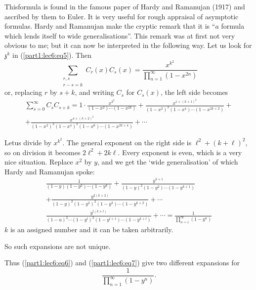 This\pageoriginale  formula is found in the famous paper of Hardy and Ramanujan
(1917) and ascribed by them to Euler. It is very useful for rough
appraisal of asymptotic formulas. Hardy and Ramanujan make the cryptic
remark that it is ``$a$ formula which lends itself to wide
generalisations''. This remark was at first not very obvious to me;
but it can now be interpreted in the following way. Let us look for
$\mathfrak{z}^k$ in (\ref{part1:lec6:eq5}). Then
$$
\sum_{\substack{r,s\\r-s=k}} C_r (x) C_s (x)
=\frac{x^{k^2}}{\prod\limits^\infty_{n=1} (1-x^{2n})}
$$ 
or, replacing $r$ by $s+k$, and writing $C_s$ for $C_s(x)$, the left
side becomes
\begin{multline*}
  \sum^\infty_{s=0} C_s C_{s+k}  = 1\cdot \frac{x^{k^2}}{(1-x^2)
    \cdots (1-x^{2k})}
    +\frac{x^{1+(k+1)^2}}{(1-x^2)^2(1-x^4)\cdots(1-x^{2k+2})}+\\
       + \frac{x^{4+(k+2)^2}}{(1-x^2)^2(1-x^4)^2(1-x^6)\cdots
        (1-x^{2k+4})}+ \cdots
\end{multline*}

Let\pageoriginale  us divide by $x^{k^2}$. The general exponent on the right side is
$\ell^2 + (k+ \ell)^2$, so on division it becomes $2\ell^2 +
2k\ell$. Every exponent is even, which is a very nice
situation. Replace $x^2$ by $y$, and we get the `wide generalisation'
of which Hardy and Ramanujan spoke:
\begin{multline*}
  \frac{1}{(1-y)(1-y^2)\cdots (1-y^k)} +
  \frac{y^{k+1}}{(1-y)^2(1-y^2)\cdots (1-y^{k+1})}\\
  + \frac{y^{2(k+2)}}{(1-y)^2(1-y^2)^2(1-y^3)\cdots (1-y^{k+2})}+ \cdots
  \\
  \frac{y^{l (k+l)}}{(1-u)^2\cdots (1-y^l)^2 (1-y^{l+1})\cdots
    (1-y^{k+l})} + \cdots = \frac{1}{\prod\limits^\infty_{n=1}
    (1-y^n)} \tag{7}\label{part1:lec6:eq7} 
\end{multline*}
$k$ is an assigned number and it can be taken arbitrarily.

So such expansions are not unique.

Thus (\ref{part1:lec6:eq6}) and (\ref{part1:lec6:eq7}) give two
different expansions for 
$$
\frac{1}{\prod\limits^\infty_{n=1} (1-y^n)}.
$$

